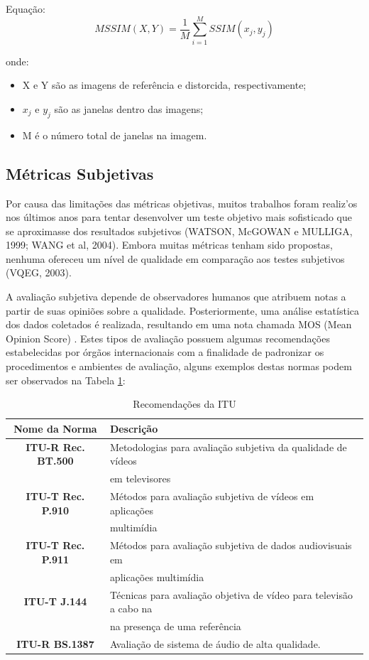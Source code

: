 Equação: \[MSSIM(X, Y) = \frac{1}{M} \sum_{i=1}^{M} SSIM(x_{j}, y_{j})\]

onde:
\begin{itemize}
	\item X e Y são as imagens de referência e distorcida, respectivamente;
	\item \(x_{j}\) e \(y_{j}\) são as janelas dentro das imagens;
	\item M é o número total de janelas na imagem.
\end{itemize}

\subsection{Métricas Subjetivas}

Por causa das limitações das métricas objetivas, muitos trabalhos foram realiz'os nos últimos anos para tentar desenvolver um teste objetivo mais sofisticado que se aproximasse dos resultados subjetivos (WATSON, McGOWAN e MULLIGA, 1999; WANG et al, 2004). Embora muitas métricas tenham sido propostas, nenhuma ofereceu um nível de qualidade em comparação aos testes subjetivos (VQEG, 2003).

A avaliação subjetiva depende de observadores humanos que atribuem notas a partir de suas opiniões sobre a qualidade. Posteriormente, uma análise estatística dos dados coletados é realizada, resultando em uma nota chamada MOS (Mean Opinion Score) \cite{itup930} \cite{albini}. Estes tipos de avaliação possuem algumas recomendações estabelecidas por órgãos internacionais com a finalidade de padronizar os procedimentos e ambientes de avaliação, alguns exemplos destas normas podem ser observados na Tabela \ref{tab:recomendacoes}:

\begin{table}
	\centering
	\caption{Recomendações da ITU}
	\label{tab:recomendacoes}
	\begin{tabular}{c|l}
		\hline
		\textbf{Nome da Norma} & Descrição \\
		\hline
		\textbf{ITU-R Rec. BT.500} & Metodologias para avaliação subjetiva da qualidade de vídeos \\
			& em televisores \\
		\textbf{ITU-T Rec. P.910} & Métodos para avaliação subjetiva de vídeos em aplicações \\
			& multimídia \\
		\textbf{ITU-T Rec. P.911} & Métodos para avaliação subjetiva de dados audiovisuais em \\
			& aplicações multimídia \\
		\textbf{ITU-T J.144} & Técnicas para avaliação objetiva de vídeo para televisão a cabo na \\
			& na presença de uma referência \\
		\textbf{ITU-R BS.1387} & Avaliação de sistema de áudio de alta qualidade. \\
		\hline
	\end{tabular}
\end{table}


